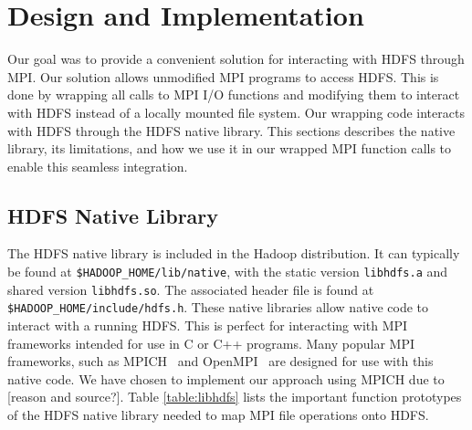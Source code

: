 

\section{Design and Implementation}
\label{sec:impl}
Our goal was to provide a convenient solution for interacting with HDFS through MPI. Our solution allows unmodified MPI programs to access HDFS. This is done by wrapping all calls to MPI I/O functions and modifying them to interact with HDFS instead of a locally mounted file system. Our wrapping code interacts with HDFS through the HDFS native library. This sections describes the native library, its limitations, and how we use it in our wrapped MPI function calls to enable this seamless integration.

\subsection{HDFS Native Library}
The HDFS native library is included in the Hadoop distribution. It can typically be found at \texttt{\$HADOOP\_HOME/lib/native}, with the static version \texttt{libhdfs.a} and shared version \texttt{libhdfs.so}. The associated header file is found at \texttt{\$HADOOP\_HOME/include/hdfs.h}. These native libraries allow native code to interact with a running HDFS. This is perfect for interacting with MPI frameworks intended for use in C or C++ programs. Many popular MPI frameworks, such as MPICH~\cite{mpich} and OpenMPI~\cite{openmpi} are designed for use with this native code. We have chosen to implement our approach using MPICH due to [reason and source?]. Table \ref{table:libhdfs} lists the important function prototypes of the HDFS native library needed to map MPI file operations onto HDFS.

